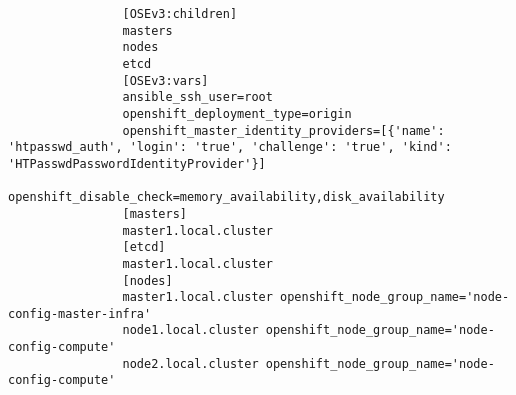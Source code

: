 
\newpage
{}\label{appendix:Archivo Inventory}
\begin{verbatim}
				[OSEv3:children]
				masters
				nodes
				etcd
				[OSEv3:vars]
				ansible_ssh_user=root
				openshift_deployment_type=origin
				openshift_master_identity_providers=[{'name': 'htpasswd_auth', 'login': 'true', 'challenge': 'true', 'kind': 'HTPasswdPasswordIdentityProvider'}]
				openshift_disable_check=memory_availability,disk_availability
				[masters]
				master1.local.cluster
				[etcd]
				master1.local.cluster
				[nodes]
				master1.local.cluster openshift_node_group_name='node-config-master-infra'
				node1.local.cluster openshift_node_group_name='node-config-compute'
				node2.local.cluster openshift_node_group_name='node-config-compute'
\end{verbatim}